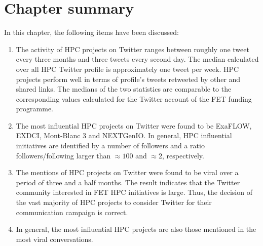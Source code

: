 \section{Chapter summary}
In this chapter, the following items have been discussed:

\begin{enumerate}
 \item The activity of HPC projects on Twitter ranges between roughly one tweet every three months and three tweets every second day. The median calculated over all HPC Twitter profile is approximately one tweet per week. HPC projects perform well in terms of profile's tweets retweeted by other and shared links. The medians of the two statistics are comparable to the corresponding values calculated for the Twitter account of the FET funding programme.
 \item The most influential HPC projects on Twitter were found to be ExaFLOW, EXDCI, Mont-Blanc 3 and NEXTGenIO. In general, HPC influential initiatives are identified by a number of followers and a ratio followers/following larger than $\approx 100$ and $\approx 2$, respectively. 
 \item The mentions of HPC projects on Twitter were found to be viral over a period of three and a half months. The result indicates that the Twitter community interested in FET HPC initiatives is large. Thus, the decision of the vast majority of HPC projects to consider Twitter for their communication campaign is correct.
 \item In general, the most influential HPC projects are also those mentioned in the most viral conversations.    
\end{enumerate}  



